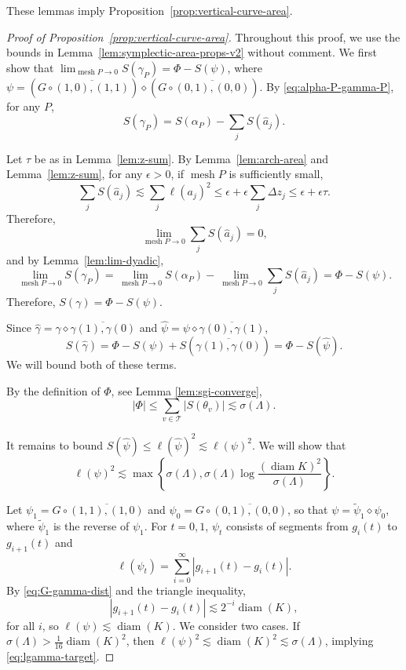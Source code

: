 \documentclass[12pt,reqno]{amsart}
\newcommand{\cT}{\mathcal{T}}
\DeclareMathOperator{\mesh}{mesh}
\theoremstyle{remark}
\newcommand{\0}{\mathbf{0}}
\renewcommand{\1}{\mathbf 1}
\DeclareMathOperator{\diam}{diam}
\begin{document}
These lemmas imply Proposition~\ref{prop:vertical-curve-area}.
\begin{proof}[Proof of Proposition~\ref{prop:vertical-curve-area}]
  Throughout this proof, we use the bounds in Lemma~\ref{lem:symplectic-area-props-v2} without comment.
  We first show that $\lim_{\mesh P\to 0} S(\gamma_P) = \Phi - S(\psi)$, where $\psi = (G\circ \overline{(1,0),(1,1)}) \diamond (G\circ \overline{(0,1),(0,0)})$.
  By \eqref{eq:alpha-P-gamma-P}, for any $P$,
  \begin{equation}\label{eq:vca-pf-s-gamma}
    S(\gamma_P) = S(\alpha_P) - \sum_j S(\hat{a}_j).
  \end{equation}

  Let $\tau$ be as in Lemma~\ref{lem:z-sum}. By Lemma~\ref{lem:arch-area} and Lemma~\ref{lem:z-sum}, for any $\epsilon>0$, if $\mesh P$ is sufficiently small,
  $$\sum_j S(\hat{a}_j) \lesssim \sum_j \ell(a_j)^2 \le \epsilon + \epsilon \sum_j \Delta z_j \le \epsilon + \epsilon \tau.$$
  Therefore, 
  $$\lim_{\mesh P\to 0} \sum_j S(\hat{a}_j) = 0,$$
  and by Lemma~\ref{lem:lim-dyadic},
  $$
  \lim_{\mesh P\to 0} S(\gamma_P) = \lim_{\mesh P\to 0} S(\alpha_P) - \lim_{\mesh P\to 0} \sum_j S(\hat{a}_j) = \Phi - S(\psi).
  $$
  Therefore, $S(\gamma) = \Phi - S(\psi)$.

  Since $\hat{\gamma} = \gamma \diamond \overline{\gamma(1),\gamma(0)}$ and $\hat{\psi} = \psi \diamond \overline{\gamma(0),\gamma(1)}$,
  \begin{equation}\label{eq:s-gamma-s-psi}
    S(\hat{\gamma}) = \Phi - S(\psi) + S(\overline{\gamma(1),\gamma(0)}) = \Phi - S(\hat{\psi}).
  \end{equation}
  We will bound both of these terms. 

  By the definition of $\Phi$, see Lemma \ref{lem:sgi-converge},
  $$|\Phi| \le \sum_{v\in \cT} |S(\theta_v)| \lesssim \sigma(\Lambda).$$
  
  It remains to bound $S(\hat{\psi})\leq \ell(\hat\psi)^2\lesssim \ell(\psi)^2$. We will show that 
  \begin{equation}\label{eq:lgamma-target}
    \ell(\psi)^2 \lesssim \max\left\{\sigma(\Lambda), \sigma(\Lambda) \log \frac{(\diam K)^2}{\sigma(\Lambda)}\right\}.
  \end{equation}
  
  Let $\psi_1 = G\circ \overline{(1,1),(1,0)}$ and $\psi_0 = G\circ \overline{(0,1),(0,0)}$, so that $\psi = \tilde{\psi}_1 \diamond \psi_0$, where $\tilde{\psi}_1$ is the reverse of $\psi_1$. For $t=0,1$, $\psi_t$ consists of segments from $g_i(t)$ to $g_{i+1}(t)$ and
  $$\ell(\psi_t) = \sum_{i=0}^\infty |g_{i+1}(t) - g_i(t)|.$$
  By \eqref{eq:G-gamma-dist} and the triangle inequality, 
  \begin{equation}\label{eq:pointwise-psi}
    |g_{i+1}(t) - g_i(t)| \lesssim 2^{-i}\diam(K),
  \end{equation}
  for all $i$, so $\ell(\psi) \lesssim \diam(K)$. We consider two cases. If $\sigma(\Lambda) > \frac{1}{16} \diam(K)^2$, then $\ell(\psi)^2 \lesssim \diam(K)^2 \lesssim \sigma(\Lambda)$, implying \eqref{eq:lgamma-target}.


\end{proof}
\end{document}
